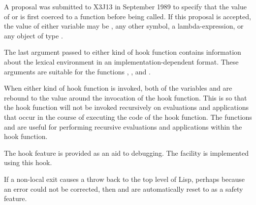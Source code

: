 \begin{defun}[Variable]
\begin{newer}
A proposal was submitted to X3J13 in September 1989 to specify
that the value of  or  is first coerced to a
function before being called.  If this proposal is accepted,
the value of either variable may be , any other symbol,
a lambda-expression, or any object of type .
\end{newer}

The last argument passed to either kind of hook function contains information
about the lexical environment in an implementation-dependent format.
These arguments are suitable for the functions
, , and .

When either kind of hook function is invoked, both of the variables
and  are rebound to the value {\nil} around the invocation
of the hook function.  This is so that the hook function will not be
invoked recursively on evaluations and applications that occur
in the course of executing the code of the hook function.
The functions 
and  are useful for performing recursive evaluations
and applications within the hook function.

The hook feature is provided as an aid to debugging.
The  facility is implemented using this hook.

If a non-local exit causes a throw back to the top level
of Lisp, perhaps because an error could not
be corrected, then  and  are
automatically reset to {\false} as a safety feature.
\end{defun}

